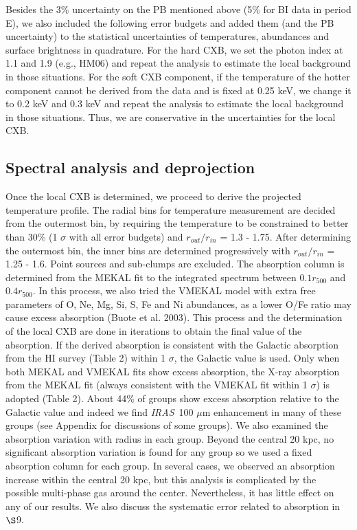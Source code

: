 \documentclass{aastex}
\def\iras        {{\em IRAS}\/}
\begin{document}
Besides the 3\% uncertainty on the PB mentioned above (5\% for BI data in period E),
we also included the following error budgets and added them (and the PB uncertainty)
to the statistical uncertainties of temperatures, abundances and surface brightness
in quadrature. For the hard CXB, we set the photon index at 1.1 and 1.9 (e.g., HM06)
and repeat the analysis to estimate the local background in those situations. For the
soft CXB component, if the temperature of the hotter component cannot be derived from
the data and is fixed at 0.25 keV, we change it to 0.2 keV and 0.3 keV and repeat the
analysis to estimate the local background in those situations. Thus, we are
conservative in the uncertainties for the local CXB.

\subsection{Spectral analysis and deprojection}

Once the local CXB is determined, we proceed to derive the projected temperature
profile. The radial bins for temperature measurement are decided from the outermost
bin, by requiring the temperature to be constrained to better than 30\% (1 $\sigma$
with all error budgets) and $r_{out} / r_{in}$ = 1.3 - 1.75. After determining the
outermost bin, the inner bins are determined progressively with $r_{out} / r_{in}$ =
1.25 - 1.6. Point sources and sub-clumps are excluded. The absorption column is
determined from the MEKAL fit to the integrated spectrum between $0.1 r_{500}$
and $0.4 r_{500}$. In this process, we also tried the VMEKAL model with extra free
parameters of O, Ne, Mg, Si, S, Fe and Ni abundances, as a lower O/Fe ratio may
cause excess absorption (Buote et al. 2003). This process and the determination of
the local CXB are done in iterations to obtain the final value of the absorption.
If the derived absorption is consistent with the Galactic absorption from the HI
survey (Table 2) within 1 $\sigma$, the Galactic value is used. Only when both MEKAL
and VMEKAL fits show excess absorption, the X-ray absorption from the MEKAL fit
(always consistent with the VMEKAL fit within 1 $\sigma$) is adopted (Table 2).
About 44\% of groups show excess absorption relative to the Galactic value
and indeed we find \iras\ 100 $\mu$m enhancement in many of these groups (see Appendix
for discussions of some groups). We also examined the absorption variation with
radius in each group. Beyond the central 20 kpc, no significant absorption variation
is found for any group so we used a fixed absorption column for each group. In several
cases, we observed an absorption increase within the central 20 kpc, but this analysis
is complicated by the possible multi-phase gas around the center. Nevertheless,
it has little effect on any of our results. We also discuss the systematic error related to
absorption in $\S$9.
\end{document}
